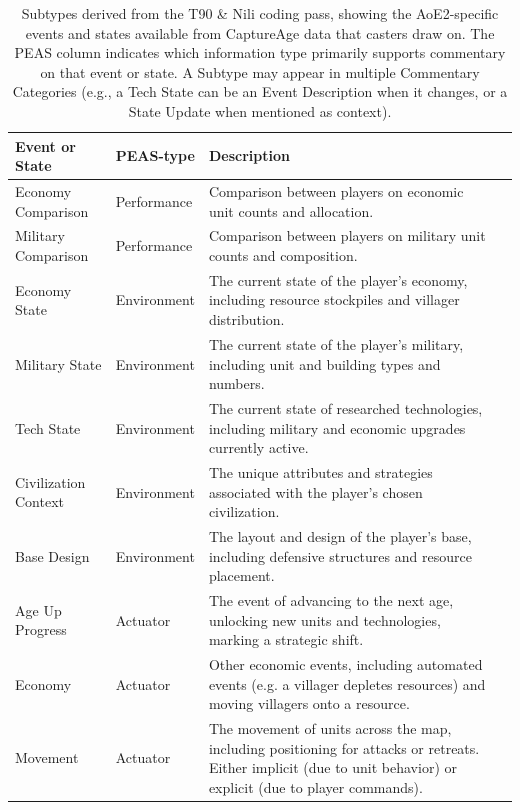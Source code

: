 \begin{table}[htbp]
  \begin{threeparttable}
    \caption{Subtypes derived from the T90 \& Nili coding pass, showing the AoE2-specific events and states available from CaptureAge data that casters draw on. The PEAS column indicates which information type primarily supports commentary on that event or state. A Subtype may appear in multiple Commentary Categories (e.g., a Tech State can be an Event Description when it changes, or a State Update when mentioned as context).}
    \centering
    \setlength{\tabcolsep}{4pt}
    \renewcommand{\arraystretch}{1.5}
    \begin{tabularx}{\textwidth}{@{}>{\arraybackslash}p{3.2cm}>{\arraybackslash}p{2cm}X X@{}}
      \toprule
      \textbf{Event or State}  & \textbf{PEAS-type} & \textbf{Description} \\ \midrule
      Economy Comparison   & Performance & Comparison between players on economic unit counts and allocation. \\
      Military Comparison  & Performance & Comparison between players on military unit counts and composition. \\
      Economy State        & Environment & The current state of the player's economy, including resource stockpiles and villager distribution. \\
      Military State       & Environment & The current state of the player's military, including unit and building types and numbers. \\
      Tech State           & Environment & The current state of researched technologies, including military and economic upgrades currently active. \\
      Civilization Context & Environment & The unique attributes and strategies associated with the player's chosen civilization. \tnote{1} \\
      Base Design          & Environment & The layout and design of the player's base, including defensive structures and resource placement. \\
      Age Up Progress      & Actuator  & The event of advancing to the next age, unlocking new units and technologies, marking a strategic shift. \\
      Economy              & Actuator & Other economic events, including automated events (e.g. a villager depletes resources) and moving villagers onto a resource. \\
      Movement             & Actuator & The movement of units across the map, including positioning for attacks or retreats. Either implicit (due to unit behavior) or explicit (due to player commands). \tnote{2} \\

\end{tabularx}
\end{threeparttable}
\end{table}
